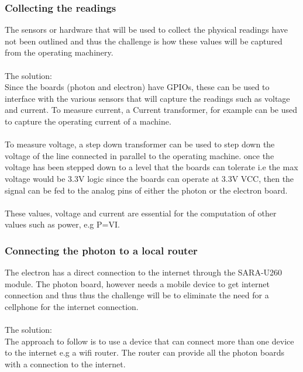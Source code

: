 \documentclass{scrartcl}
\begin{document}
\subsubsection{Collecting the readings}
The sensors or hardware that will be used to collect the physical readings have not been outlined and thus the challenge is how these values will be captured from the operating machinery.\\ \\
The solution:\\ 
Since the boards (photon and electron) have GPIOs, these can be used to interface with the various sensors that will capture the readings such as voltage and current. To measure current, a Current transformer, for example can be used to capture the operating current of a machine.\\
\\
To measure voltage, a step down transformer can be used to step down the voltage of the line connected in parallel to the operating machine. once the voltage has been stepped down to a level that the boards can tolerate i.e the max voltage would be 3.3V logic since the boards can operate at 3.3V VCC, then the signal can be fed to the analog pins of either the photon or the electron board.
\\ \\
These values, voltage and current are essential for the computation of other values such as power, e.g P=VI. 

\subsubsection{Connecting the photon to a local router}
The electron has a direct connection to the internet through the SARA-U260 module. The photon board, however needs a mobile device to get internet connection and thus thus the challenge will be to eliminate the need for a cellphone for the internet connection.\\ \\
The solution:\\
The approach to follow is to use a device that can connect more than one device to the internet e.g a wifi router. The router can provide all the photon boards with a connection to the internet. 
\end{document}
